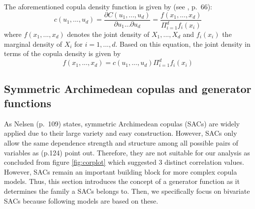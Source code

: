 \documentclass[
]{krantz}
\begin{document}
The aforementioned copula density function is given by (see
\citet{zhang2019}, p.~66):
\[
c(u_1, ..., u_d) = \frac{\partial C(u_1, ..., u_d)}{\partial u_1 ... \partial u_d} = \frac{f(x_1, ..., x_d)}{\Pi_{i = 1}^df_i(x_i)}
\label{eq:copulapdf}
\]
where \(f(x_1, ..., x_d)\) denotes the joint density of \(X_1, ..., X_d\)
and \(f_i(x_i)\) the marginal density of \(X_i\) for
\(i = 1, ..., d\). Based on this equation, the joint density in terms of the copula density is given by
\[
f(x_1, ..., x_d) = c(u_1, ..., u_d)\Pi_{i = 1}^df_i(x_i)
\label{eq:marginalpdf}
\]

\subsection{Symmetric Archimedean copulas and generator functions}\label{archcops}

As Nelsen (p.~109) states, symmetric Archimedean copulas (SACs) are
widely applied due to their large variety and easy construction. However, SACs only allow the same
dependence strength and structure among all possible pairs of variables as \citet{zhang2019}
(p.124) point out. Therefore, they are not suitable for our analysis as concluded from figure \ref{fig:corplot} which suggested \(3\) distinct correlation values.
However, SACs remain an important building block for more complex copula models.
Thus, this section introduces the concept of a generator function as it determines the family a SACs belongs to.
Then, we specifically focus on bivariate SACs because following models are based on these.
\end{document}
